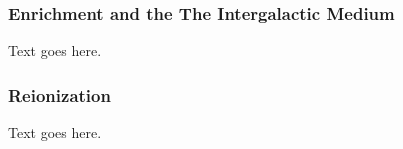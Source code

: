 \subsubsection{Enrichment and the The Intergalactic Medium}
\label{subsubsec:early_universe--baryonic_processes--igm}


Text goes here.



\subsubsection{Reionization}
\label{subsubsec:early_universe--baryonic_processes--reionization}


Text goes here.




